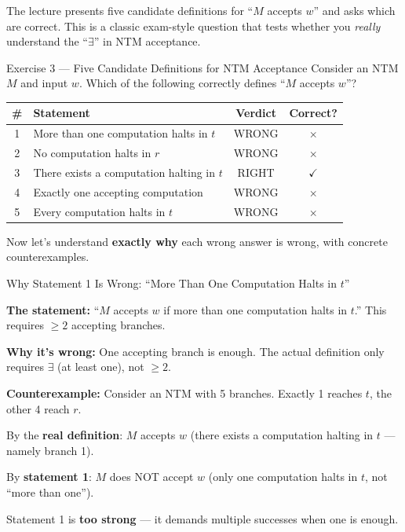 The lecture presents five candidate definitions for ``$M$ accepts $w$'' and asks
which are correct. This is a classic exam-style question that tests whether you
\emph{really} understand the ``$\exists$'' in NTM acceptance.

\begin{conceptbox}{Exercise 3 --- Five Candidate Definitions for NTM Acceptance}
Consider an NTM $M$ and input $w$. Which of the following correctly defines
``$M$ accepts $w$''?

\begin{center}
\renewcommand{\arraystretch}{1.6}
\begin{tabular}{clcc}
\toprule
\textbf{\#} & \textbf{Statement} & \textbf{Verdict} & \textbf{Correct?} \\
\midrule
1 & More than one computation halts in $t$ & WRONG & \textcolor{red!70!black}{$\boldsymbol{\times}$} \\
2 & No computation halts in $r$ & WRONG & \textcolor{red!70!black}{$\boldsymbol{\times}$} \\
3 & There exists a computation halting in $t$ & RIGHT & \textcolor{green!60!black}{$\boldsymbol{\checkmark}$} \\
4 & Exactly one accepting computation & WRONG & \textcolor{red!70!black}{$\boldsymbol{\times}$} \\
5 & Every computation halts in $t$ & WRONG & \textcolor{red!70!black}{$\boldsymbol{\times}$} \\
\bottomrule
\end{tabular}
\end{center}

Now let's understand \textbf{exactly why} each wrong answer is wrong, with
concrete counterexamples.
\end{conceptbox}

\begin{examplebox}{Why Statement 1 Is Wrong: ``More Than One Computation Halts in $t$''}

\textbf{The statement:} ``$M$ accepts $w$ if more than one computation halts in
$t$.'' This requires $\geq 2$ accepting branches.

\textbf{Why it's wrong:} One accepting branch is enough. The actual definition
only requires $\exists$ (at least one), not $\geq 2$.

\textbf{Counterexample:} Consider an NTM with 5 branches. Exactly 1 reaches
$t$, the other 4 reach $r$.

By the \textbf{real definition}: $M$ accepts $w$ (there exists a computation
halting in $t$ --- namely branch 1).

By \textbf{statement 1}: $M$ does NOT accept $w$ (only one computation halts in
$t$, not ``more than one'').

Statement 1 is \textbf{too strong} --- it demands multiple successes when one is
enough.
\end{examplebox}

